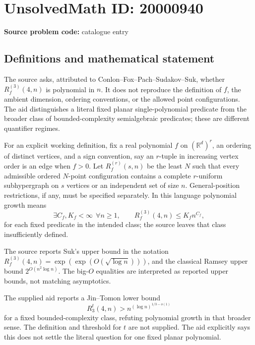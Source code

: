 \documentclass[11pt]{article}
\newcommand{\R}{\mathbb{R}}
\begin{document}
\section*{UnsolvedMath ID: 20000940}
\textbf{Source problem code:} catalogue entry
\subsection{Definitions and mathematical statement}
The source asks, attributed to Conlon--Fox--Pach--Sudakov--Suk, whether \(R_f^{(3)}(4,n)\) is polynomial in \(n\). It does not reproduce the definition of \(f\), the ambient dimension, ordering conventions, or the allowed point configurations. The aid distinguishes a literal fixed planar single-polynomial predicate from the broader class of bounded-complexity semialgebraic predicates; these are different quantifier regimes.

For an explicit working definition, fix a real polynomial \(f\) on \((\R^d)^r\), an ordering of distinct vertices, and a sign convention, say an \(r\)-tuple in increasing vertex order is an edge when \(f>0\). Let \(R_f^{(r)}(s,n)\) be the least \(N\) such that every admissible ordered \(N\)-point configuration contains a complete \(r\)-uniform subhypergraph on \(s\) vertices or an independent set of size \(n\). General-position restrictions, if any, must be specified separately. In this language polynomial growth means
\[
 \exists C_f,K_f<\infty\ \ \forall n\ge1,\qquad
 R_f^{(3)}(4,n)\le K_fn^{C_f},
\]
for each fixed predicate in the intended class; the source leaves that class insufficiently defined.

The source reports Suk's upper bound in the notation
\(R_f^{(3)}(4,n)=\exp(\exp(O(\sqrt{\log n})))\), and the classical Ramsey upper bound \(2^{O(n^2\log n)}\). The big-\(O\) equalities are interpreted as reported upper bounds, not matching asymptotics.

The supplied aid reports a Jin--Tomon lower bound
\[
 R_3^t(4,n)>n^{(\log n)^{1/3-o(1)}}
\]
for a fixed bounded-complexity class, refuting polynomial growth in that broader sense. The definition and threshold for \(t\) are not supplied. The aid explicitly says this does not settle the literal question for one fixed planar polynomial.
\end{document}
